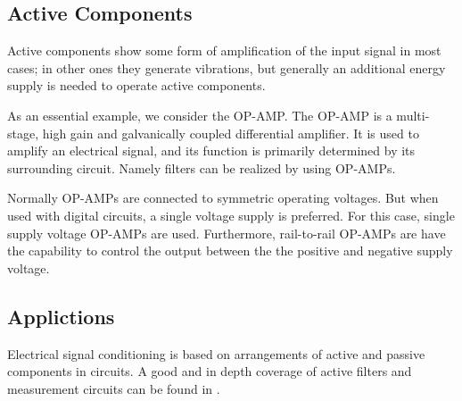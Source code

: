 




\subsection{Active Components}
Active components show some form of amplification of the input signal in most cases; in other ones they generate vibrations, but generally an additional energy supply is needed to operate active components.

As an essential example, we consider the \acf{OP-AMP}. The \ac{OP-AMP} is a multi-stage, high gain and galvanically coupled differential amplifier. It is used to amplify an electrical signal, and its function is primarily determined by its surrounding circuit. Namely filters can be realized by using \ac{OP-AMP}s.

Normally \ac{OP-AMP}s are connected to symmetric operating voltages. But when used with digital circuits, a single voltage supply is preferred. For this case, single supply voltage \ac{OP-AMP}s are used. Furthermore, rail-to-rail \ac{OP-AMP}s are have the capability to control the output between the the positive and negative supply voltage.

\subsection{Applictions}
Electrical signal conditioning is based on arrangements of active and passive components in circuits. A good and in depth coverage of active filters and measurement circuits can be found in \cite{Tietze2008}.